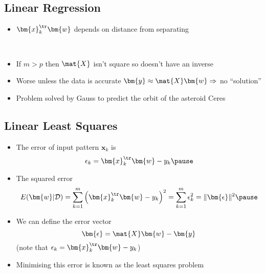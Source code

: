 \begin{slide}
\section[-2]{Linear Regression}

\pb
\begin{itemize}\squeeze
\item $\bm{x}_k^\tr \bm{w}$ depends on distance from separating\pauseh{}
\vspace*{-1cm}
\begin{center}
\pause\\
\vspace*{-0.5cm}
\end{center}
\item If $m>p$ then $\mat{X}$ isn't square so doesn't have an inverse\pauseh
\item Worse unless the data is accurate $\bm{y} \approx \mat{X}
  \bm{w}\Rightarrow$ no ``solution''\pauseh
\item Problem solved by Gauss to predict the orbit of the asteroid Ceres\pauseh
\end{itemize}
\end{slide}


\begin{slide}
\section[-1.5]{Linear Least Squares}

\begin{PauseHighLight}

\begin{itemize}\squeeze
\item The error of input pattern $\bm{x}_k$ is
  \begin{displaymath}
    \epsilon_k  = \bm{x}_k^\tr \bm{w}-y_k\pause
  \end{displaymath}
\item The squared error
  \begin{displaymath}
    E(\bm{w}|\mathcal{D}) = 
    \sum_{k=1}^m\left(\bm{x}_k^\tr \bm{w}-y_k\right)^2
    = \sum_{k=1}^m \epsilon_k^2 = \| \bm{\epsilon} \|^2 \pause
  \end{displaymath}
\item We can define the error vector
  \begin{displaymath}
    \bm{\epsilon} = \mat{X} \bm{w} - \bm{y}
  \end{displaymath}
(note that $\epsilon_k = \bm{x}_k^\tr \bm{w} -y_k$)\pause
\item Minimising this error is known as the least squares problem\pause
\end{itemize}

\end{PauseHighLight}
\end{slide}

